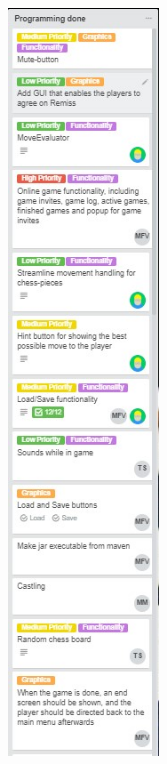 \documentclass{article}
\begin{document}
\includegraphics[width=4cm]{20180510-programmingdone1.jpg}
\end{document}
